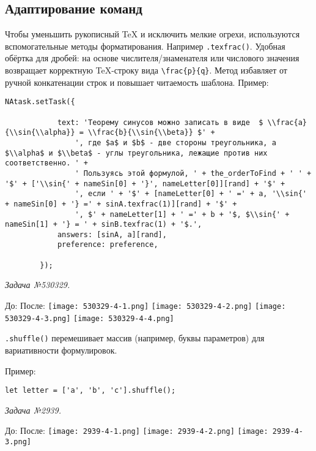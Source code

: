 \subsection{Адаптирование команд}
Чтобы уменьшить рукописный TeX и исключить мелкие огрехи, используются вспомогательные методы форматирования. Например \texttt{.texfrac()}.
Удобная обёртка для дробей: на основе числителя/знаменателя или числового значения возвращает корректную TeX-строку вида \verb|\frac{p}{q}|. 
Метод избавляет от ручной конкатенации строк и повышает читаемость шаблона.
Пример:
\begin{lstlisting}
NAtask.setTask({

			text: 'Теорему синусов можно записать в виде  $ \\frac{a}{\\sin{\\alpha}} = \\frac{b}{\\sin{\\beta}} $' +
				', где $a$ и $b$ - две стороны треугольника, а $\\alpha$ и $\\beta$ - углы треугольника, лежащие против них соответственно. ' +
				' Пользуясь этой формулой, ' + the_orderToFind + ' ' + '$' + ['\\sin{' + nameSin[0] + '}', nameLetter[0]][rand] + '$' +
				', если ' + '$' + [nameLetter[0] + ' =' + a, '\\sin{' + nameSin[0] + '} =' + sinA.texfrac(1)][rand] + '$' +
				', $' + nameLetter[1] + ' =' + b + '$, $\\sin{' + nameSin[1] + '} = ' + sinB.texfrac(1) + '$.',
			answers: [sinA, a][rand],
			preference: preference,

		});
\end{lstlisting}
\textsl{Задача №530329.}
 
До:
После:
\texttt{[image: 530329-4-1.png]}
\texttt{[image: 530329-4-2.png]}
\texttt{[image: 530329-4-3.png]}
\texttt{[image: 530329-4-4.png]}

 \texttt{.shuffle()} перемешивает массив (например, буквы параметров) для вариативности формулировок.

Пример:
\begin{lstlisting}
let letter = ['a', 'b', 'c'].shuffle();
\end{lstlisting}
\textsl{Задача №2939.}
 
До:
После:
\texttt{[image: 2939-4-1.png]}
\texttt{[image: 2939-4-2.png]}
\texttt{[image: 2939-4-3.png]}

